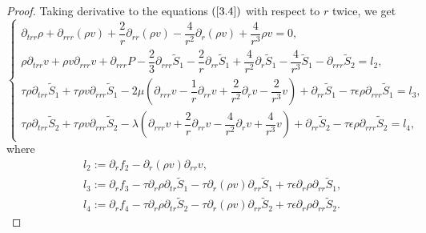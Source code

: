 \documentclass[10pt,reqno]{amsart}
\numberwithin{equation}{section}
\begin{document}
	\begin{proof}
		Taking derivative to the equations $(\ref{3.4})$ with respect to $r$ twice, we get
		\begin{equation}\label{60}
			\begin{cases}
				\partial_{trr} \rho+\partial_{rrr}(\rho v)+\dfrac{2}{r} \partial_{rr}(\rho v)-\dfrac{4}{r^2} \partial_{r}(\rho v)+\dfrac{4}{r^3}\rho v=0, \\
				\rho\partial_{trr} v+\rho v \partial_{rrr} v+\partial_{rrr} P-\dfrac{2}{3}\partial_{rrr}  \tilde{S}_1-\dfrac{2}{r} \partial_{rr} \tilde{S}_1+\dfrac{4}{r^2}\partial_{r}\tilde{S}_1-\dfrac{4}{r^3}\tilde{S}_1-\partial_{rrr} \tilde{S}_2=l_2,\\
				\tau \rho \partial_{trr} \tilde{S}_1+\tau \rho v \partial_{rrr}\tilde{S}_1 
				-2\mu\left(\partial_{rrr} v- \dfrac{1}{r}\partial_{rr} v
				+\dfrac{2}{r^2} \partial_{r}v-\dfrac{2}{r^3}v \right)+\partial_{rr} \tilde{S}_1-\tau \epsilon\rho\partial_{rrr}\tilde{S}_1
				=l_3, \\
				\tau  \rho \partial_{trr} \tilde{S}_2+\tau  \rho v \partial_{rrr}\tilde{S}_2
				-\lambda \left(\partial_{rrr} v+\dfrac{2}{r}\partial_{rr} v-\dfrac{4}{r^2} \partial_{r}v+\dfrac{4}{r^3}v\right)+\partial_{rr} \tilde{S}_2 -\tau  \epsilon\rho\partial_{rrr}\tilde{S}_2
				=l_4,
			\end{cases}
		\end{equation}
		where
		\begin{equation}
			\begin{aligned}\nonumber
				&l_2:=\partial_{r}f_2-\partial_{r}(\rho v)\partial_{rr} v,\\
				&l_3:=\partial_{r}f_3
				-\tau \partial_{r}\rho \partial_{tr} \tilde{S}_1
				-\tau \partial_{r}(\rho v) \partial_{rr}\tilde{S}_1
				+\tau \epsilon\partial_{r}\rho\partial_{rr}\tilde{S}_1,\\
				&l_4:=\partial_{r}f_4-\tau  \partial_{r}\rho \partial_{tr} \tilde{S}_2-\tau  \partial_{r}(\rho v) \partial_{rr}\tilde{S}_2
				+\tau  \epsilon\partial_{r}\rho\partial_{rr}\tilde{S}_2.
			\end{aligned}
		\end{equation}
		

\end{proof}
\end{document}
